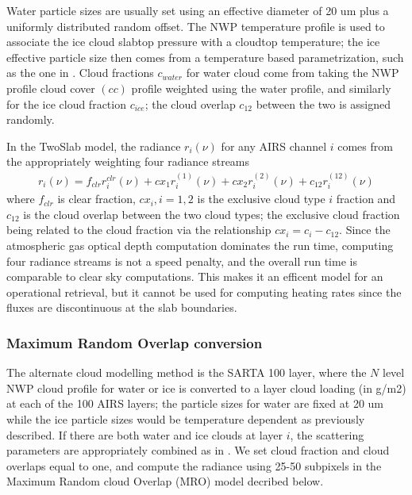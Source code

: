 \documentclass[agupp]{aguplus}              %
\begin{document}
\begin{article}
Water particle sizes are usually set using an effective diameter of 20 um plus a
uniformly distributed random offset. The NWP temperature profile is
used to associate the ice cloud slabtop pressure with a cloudtop
temperature; the ice effective particle size then comes from a
temperature based parametrization, such as the one in
\citep{ou:95}. Cloud fractions $c_{water}$ for water cloud come from
taking the NWP profile cloud cover $(cc)$ profile weighted using the
water profile, and similarly for the ice cloud fraction $c_{ice}$; the
cloud overlap $c_{12}$ between the two is assigned randomly.

In the TwoSlab model, the radiance $r_{i}(\nu)$ for any AIRS channel $i$ comes from
the appropriately weighting four radiance streams 
\begin{eqnarray} r_{i}(\nu) = f_{clr}
r^{clr}_{i}(\nu) + cx_{1} r^{(1)}_{i}(\nu) + cx_{2} r^{(2)}_{i}(\nu) +
c_{12} r^{(12)}_{i}(\nu) 
\end{eqnarray} 
where $f_{clr}$ is clear fraction, $cx_{i},i=1,2$ is the exclusive
cloud type $i$ fraction and $c_{12}$ is the cloud overlap between the
two cloud types; the exclusive cloud fraction being related to the
cloud fraction via the relationship $cx_{i} = c_{i} - c_{12}$. Since
the atmospheric gas optical depth computation dominates the run time,
computing four radiance streams is not a speed penalty, and the
overall run time is comparable to clear sky computations.  This makes
it an efficent model for an operational retrieval, but it
cannot be used for computing heating rates since the fluxes are
discontinuous at the slab boundaries.

\subsubsection{Maximum Random Overlap conversion}

The alternate cloud modelling method is the SARTA 100 layer, where the
$N$ level NWP cloud profile for water or ice is converted to a layer
cloud loading (in g/m2) at each of the 100 AIRS layers; the particle
sizes for water are fixed at 20 um while the ice particle sizes would
be temperature dependent as previously described.  If there are both
water and ice clouds at layer $i$, the scattering parameters are
appropriately combined as in \citep{sun:95}. We set cloud fraction and
cloud overlaps equal to one, and compute the radiance using 25-50
subpixels in the Maximum Random cloud Overlap (MRO) model
\cite{chen:13} decribed below.


\end{article}
\end{document}
